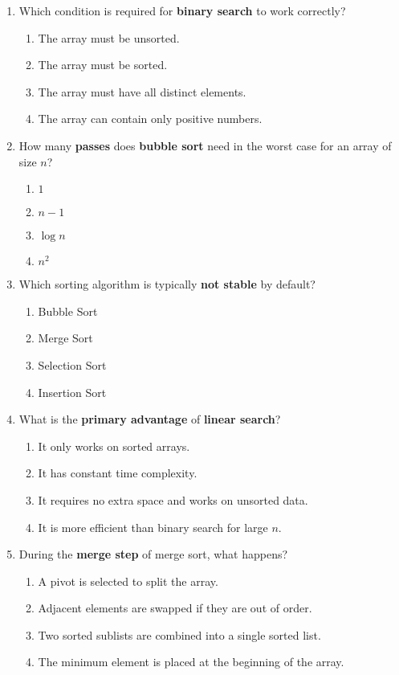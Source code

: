 \documentclass[a4paper,12pt]{article}
\begin{document}
\begin{enumerate}
  \item Which condition is required for \textbf{binary search} to work correctly?
  \begin{enumerate}[label=(\alph*)]
    \item The array must be unsorted.
    \item The array must be sorted.
    \item The array must have all distinct elements.
    \item The array can contain only positive numbers.
  \end{enumerate}

  \item How many \textbf{passes} does \textbf{bubble sort} need in the worst case for an array of size \(n\)?
  \begin{enumerate}[label=(\alph*)]
    \item \(1\)
    \item \(n - 1\)
    \item \(\log n\)
    \item \(n^2\)
  \end{enumerate}

  \item Which sorting algorithm is typically \textbf{not stable} by default?
  \begin{enumerate}[label=(\alph*)]
    \item Bubble Sort
    \item Merge Sort
    \item Selection Sort
    \item Insertion Sort
  \end{enumerate}

  \item What is the \textbf{primary advantage} of \textbf{linear search}?
  \begin{enumerate}[label=(\alph*)]
    \item It only works on sorted arrays.
    \item It has constant time complexity.
    \item It requires no extra space and works on unsorted data.
    \item It is more efficient than binary search for large \(n\).
  \end{enumerate}

  \item During the \textbf{merge step} of merge sort, what happens?
  \begin{enumerate}[label=(\alph*)]
    \item A pivot is selected to split the array.
    \item Adjacent elements are swapped if they are out of order.
    \item Two sorted sublists are combined into a single sorted list.
    \item The minimum element is placed at the beginning of the array.
  \end{enumerate}
\end{enumerate}
\end{document}
